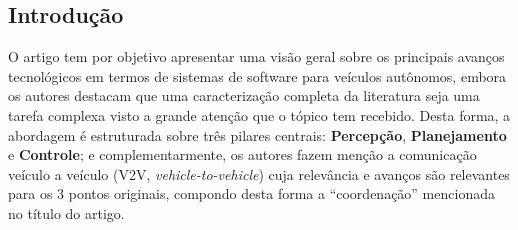 \subsection{Introdução}

O artigo\parencite{Pendleton2017Autonomous} tem por objetivo apresentar uma visão geral sobre os principais avanços tecnológicos em termos de sistemas de software para veículos autônomos, embora os autores destacam que uma caracterização completa da literatura seja uma tarefa complexa visto a grande atenção que o tópico tem recebido. Desta forma, a abordagem é estruturada sobre três pilares centrais: \textbf{Percepção}, \textbf{Planejamento} e \textbf{Controle}; e complementarmente, os autores fazem menção a comunicação veículo a veículo (V2V, \textit{vehicle-to-vehicle}) cuja relevância e avanços são relevantes para os 3 pontos originais, compondo desta forma a ``coordenação'' mencionada no título do artigo. 

